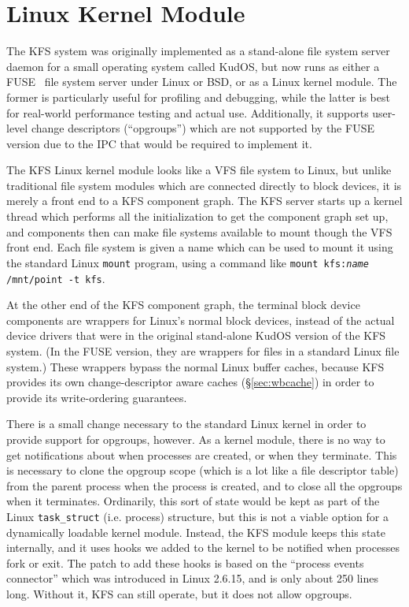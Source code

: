 \section{Linux Kernel Module}
\label{sec:linux}

The KFS system was originally implemented as a stand-alone file system server
daemon for a small operating system called KudOS, but now runs as either a
FUSE~\cite{fuse} file system server under Linux or BSD, or as a Linux kernel
module. The former is particularly useful for profiling and debugging, while the
latter is best for real-world performance testing and actual use. Additionally,
it supports user-level change descriptors (``opgroups'') which are not supported
by the FUSE version due to the IPC that would be required to implement it.

The KFS Linux kernel module looks like a VFS file system to Linux, but unlike
traditional file system modules which are connected directly to block devices,
it is merely a front end to a KFS component graph. The KFS server starts up a
kernel thread which performs all the initialization to get the component graph
set up, and components then can make file systems available to mount though the
VFS front end. Each file system is given a name which can be used to mount it
using the standard Linux \texttt{mount} program, using a command like
\mbox{\texttt{mount kfs:\textit{name} /mnt/point -t kfs}}.

At the other end of the KFS component graph, the terminal block device
components are wrappers for Linux's normal block devices, instead of the actual
device drivers that were in the original stand-alone KudOS version of the KFS
system. (In the FUSE version, they are wrappers for files in a standard Linux
file system.) These wrappers bypass the normal Linux buffer caches, because
KFS provides its own change-descriptor aware caches (\S\ref{sec:wbcache}) in
order to provide its write-ordering guarantees.

There is a small change necessary to the standard Linux kernel in order to
provide support for opgroups, however. As a kernel module, there is no way to
get notifications about when processes are created, or when they terminate. This
is necessary to clone the opgroup scope (which is a lot like a file descriptor
table) from the parent process when the process is created, and to close all the
opgroups when it terminates. Ordinarily, this sort of state would be kept as
part of the Linux \texttt{task\_struct} (i.e. process) structure, but this is
not a viable option for a dynamically loadable kernel module. Instead, the KFS
module keeps this state internally, and it uses hooks we added to the kernel to
be notified when processes fork or exit. The patch to add these hooks is based
on the ``process events connector'' which was introduced in Linux 2.6.15, and is
only about 250 lines long. Without it, KFS can still operate, but it does not
allow opgroups.
